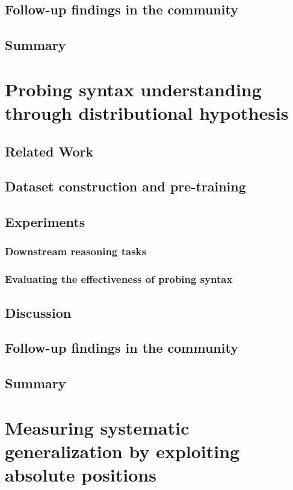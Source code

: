 \documentclass[letterpaper, 11pt]{article}
\begin{document}
\subsection{Follow-up findings in the community}
\label{sec:orgfb754db}
\subsection{Summary}
\label{sec:orgdc86a0a}

\clearpage
\section{Probing syntax understanding through distributional hypothesis}
\label{sec:org68d0083}

\subsection{Related Work}
\label{sec:orgf45bf8e}
\subsection{Dataset construction and pre-training}
\label{sec:orgd53cc12}
\subsection{Experiments}
\label{sec:orgdd86e4b}
\subsubsection{Downstream reasoning tasks}
\label{sec:org7255b43}
\subsubsection{Evaluating the effectiveness of probing syntax}
\label{sec:org78bc4b3}
\subsection{Discussion}
\label{sec:orgee338a7}
\subsection{Follow-up findings in the community}
\label{sec:orgf69807b}
\subsection{Summary}
\label{sec:org8d8d358}
\clearpage
\section{Measuring systematic generalization by exploiting absolute positions}
\label{sec:orgeb8cb36}
\end{document}

